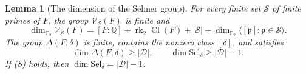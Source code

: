\documentclass[11pt]{article}
\theoremstyle{plain}
\newtheorem{lemma}[theorem]{Lemma}
\theoremstyle{definition}
\theoremstyle{remark}
\DeclareMathOperator{\Cl}{Cl}
\newcommand{\Q}{\mathbb Q}
\newcommand{\F}{\mathbb F}
\begin{document}
\begin{lemma}[The dimension of the Selmer group]\label{lem:selmer-dimension}
For every finite set $\mathcal S$ of finite primes of $F$, the group
$\mathcal V_{\mathcal S}(F)$ is finite and
\begin{equation}\label{eq:supported-dimension}
 \dim_{\F_2}\mathcal V_{\mathcal S}(F)=[F:\Q]+\operatorname{rk}_2\Cl(F)+|\mathcal S|
   -\dim_{\F_2}\langle[\mathfrak p]:\mathfrak p\in\mathcal S\rangle.
\end{equation}
The group $\Delta(F,\delta)$ is finite, contains the nonzero class
$[\delta]$, and satisfies
\begin{equation}\label{eq:selmer-dimension}
 \dim\Delta(F,\delta)\ge|\mathcal D|,\qquad
 \dim\mathrm{Sel}_\delta\ge|\mathcal D|-1.
\end{equation}
If \textup{(S)} holds, then $\dim\mathrm{Sel}_\delta=|\mathcal D|-1$.
\end{lemma}
\end{document}
